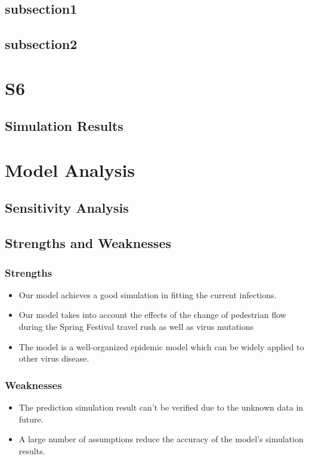 \documentclass{mcmthesis}
\begin{document}
    
\subsection{subsection1}\label{S5s1}
    

\subsection{subsection2}\label{S5s2}
	
 
\section{S6}\label{S6}
   
	
\subsection{Simulation Results}
    


\section{Model Analysis}\label{S7}

\subsection{Sensitivity Analysis}


\subsection{Strengths and Weaknesses}
\subsubsection{Strengths}
\begin{itemize}
	\item Our model achieves a good simulation in fitting the current infections.
	\item Our model takes into account the effects of the change of pedestrian flow during the Spring Festival travel rush as well as virus mutations
	\item The model is a well-organized epidemic model which can be widely applied to other virus disease.
\end{itemize}
\subsubsection{Weaknesses}
\begin{itemize}
	\item The prediction simulation result can't be verified due to the unknown data in future.  
	\item A large number of assumptions reduce the accuracy of the model’s simulation results.
\end{itemize}
\end{document}
